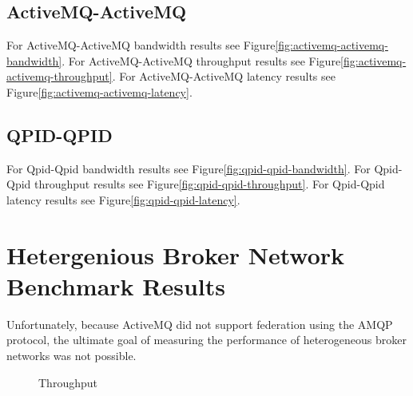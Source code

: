 \documentclass{thesis}
\begin{document}
\subsection{ActiveMQ-ActiveMQ}
For ActiveMQ-ActiveMQ bandwidth results see Figure\ref{fig:activemq-activemq-bandwidth}.
For ActiveMQ-ActiveMQ throughput results see Figure\ref{fig:activemq-activemq-throughput}.
For ActiveMQ-ActiveMQ latency results see Figure\ref{fig:activemq-activemq-latency}.
\subsection{QPID-QPID}
For Qpid-Qpid bandwidth results see Figure\ref{fig:qpid-qpid-bandwidth}.
For Qpid-Qpid throughput results see Figure\ref{fig:qpid-qpid-throughput}.
For Qpid-Qpid latency results see Figure\ref{fig:qpid-qpid-latency}.

\section{Hetergenious Broker Network Benchmark Results}
Unfortunately, because ActiveMQ did not support federation using the AMQP protocol, the ultimate goal of measuring the performance of heterogeneous broker networks was not possible.

\begin{figure}[tb] 
\centering
\caption{Throughput}
\label{fig:throughput}
\end{figure}
\end{document}
